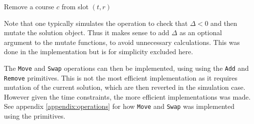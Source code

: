 \begin{algorithm}[H]
  \caption{Remove a course $c$ from slot $(t, r)$}
  \begin{algorithmic}[1]
       
          \State {}
      \EndIf
      \State {} 
    \EndFunction
    
    \Statex
             
        \EndIf
    \EndFunction
  \end{algorithmic}
\end{algorithm}

Note that one typically simulates the operation to check that $\Delta < 0$ and then mutate the solution object. Thus it makes sense to add $\Delta$ as an optional argument to the mutate functions, to avoid unnecessary calculations. This was done in the implementation but is for simplicity excluded here.

The \texttt{Move} and \texttt{Swap} operations can then be implemented, using using the \texttt{Add} and \texttt{Remove} primitives. This is not the most efficient implementation as it requires mutation of the current solution, which are then reverted in the simulation case. However given the time constraints, the more efficient implementations was made. See appendix \ref{appendix:operations} for how \texttt{Move} and \texttt{Swap} was implemented using the primitives.

